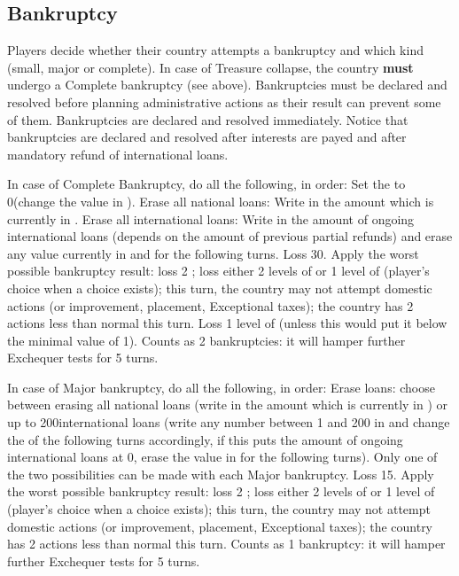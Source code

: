 \subsection{Bankruptcy}\label{chExpenses:bankruptcy}

\aparag Players decide whether their country attempts a bankruptcy and which
kind (small, major or complete).
\bparag In case of Treasure collapse, the country \textbf{must} undergo a
Complete bankruptcy (see above).
\bparag Bankruptcies must be declared and resolved before planning
administrative actions as their result can prevent some of them.
\bparag Bankruptcies are declared and resolved immediately.
\bparag Notice that bankruptcies are declared and resolved after interests are
payed and after mandatory refund of international loans.

 In case of Complete Bankruptcy, do all the
following, in order:
\bparag Set the \RT to 0\ducats (change the value in ).
\bparag Erase all national loans: Write in  the amount which is currently in .
\bparag Erase all international loans: Write in  the amount of ongoing international loans (depends on the amount
of previous partial refunds) and erase any value currently in
 and  for the following turns.
\bparag Loss 30\VPs.
\bparag Apply the worst possible bankruptcy result: loss 2 \STAB; loss either
2 levels of \TradeFLEET or 1 level of \MNU (player's choice when a choice
exists); this turn, the country may not attempt domestic actions (\DTI or \FTI
improvement, \MNU placement, Exceptional taxes); the country has 2 \TFI
actions less than normal this turn.
\bparag Loss 1 level of \DTI (unless this would put it below the minimal value
of 1).
\bparag Counts as 2 bankruptcies: it will hamper further Exchequer tests for 5
turns.

 In case of Major bankruptcy, do all the following,
in order:
\bparag Erase loans: choose between erasing all national loans (write in
 the amount which is currently in
) or up to 200\ducats international loans
(write any number between 1 and 200 in 
and change the  of the following
turns accordingly, if this puts the amount of ongoing international loans at
0\ducats, erase the value in  for
the following turns). Only one of the two possibilities can be made with each
Major bankruptcy.
\bparag Loss 15\VPs.
\bparag Apply the worst possible bankruptcy result: loss 2 \STAB; loss either
2 levels of \TradeFLEET or 1 level of \MNU (player's choice when a choice
exists); this turn, the country may not attempt domestic actions (\DTI or \FTI
improvement, \MNU placement, Exceptional taxes); the country has 2 \TFI
actions less than normal this turn.
\bparag Counts as 1 bankruptcy: it will hamper further Exchequer tests for 5
turns.

